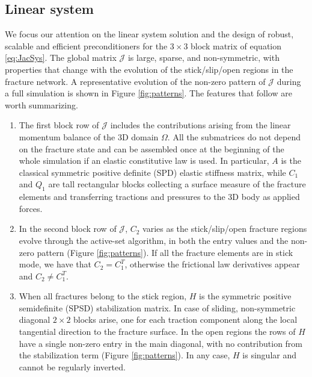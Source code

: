 \documentclass[3p,times]{elsarticle}
\theoremstyle{plain}
\newcommand{\Mat}[1]{#1}
\begin{document}
\subsection{Linear system}
We focus our attention on the linear system solution and
the design of robust, scalable and efficient preconditioners for the $3 \times 3$
block matrix of equation \eqref{eq:JacSys}. 
The global matrix $\mathcal{J}$ is large, sparse, and non-symmetric, with properties that change with the evolution of the stick/slip/open regions in the fracture network. A representative evolution of the non-zero pattern of $\mathcal{J}$ during a full simulation is shown in Figure \ref{fig:patterns}.
The features that follow are worth summarizing.
\begin{enumerate}
  \item The first block row of $\mathcal{J}$ includes the contributions arising from the linear momentum balance of the 3D domain $\Omega$. All the submatrices do not depend on the fracture state and can be assembled once at the beginning of the whole simulation if an elastic constitutive law is used. In particular, $\Mat{A}$ is the classical symmetric positive definite (SPD) elastic stiffness matrix, while %
    $\Mat{C}_1$ and $\Mat{Q}_1$ are tall rectangular blocks collecting a surface measure of the fracture elements and transferring tractions and pressures to the 3D body as applied forces. 
  \item In the second block row of $\mathcal{J}$, $\Mat{C}_2$ varies as the stick/slip/open fracture regions evolve through the active-set algorithm, in both the entry values and the non-zero pattern (Figure \ref{fig:patterns}).
  If all the fracture elements are in stick mode, we have that $\Mat{C}_2 = \Mat{C}_1^T$, otherwise
  the frictional law derivatives appear and $\Mat{C}_2\neq\Mat{C}_1^T$.
  \item When all fractures belong to the stick region, $\Mat{H}$ is the symmetric positive semidefinite (SPSD) stabilization matrix. In case of sliding,
non-symmetric diagonal $2 \times 2$ blocks arise, one for each traction component along the local tangential direction to the fracture surface. In the open regions the rows of $H$ have a single non-zero entry in the main diagonal, with no contribution from the stabilization term (Figure \ref{fig:patterns}). In any case, $H$ is singular and cannot be regularly inverted.

\end{enumerate}
\end{document}
